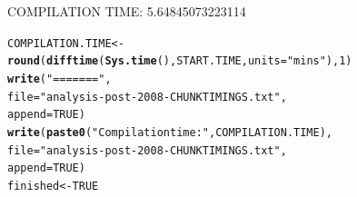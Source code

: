 \documentclass{scrreprt}\usepackage[]{graphicx}\usepackage[]{color}
\makeatletter
\newcommand{\hlnum}[1]{\textcolor[rgb]{0.686,0.059,0.569}{#1}}%
\newcommand{\hlstr}[1]{\textcolor[rgb]{0.192,0.494,0.8}{#1}}%
\newcommand{\hlstd}[1]{\textcolor[rgb]{0.345,0.345,0.345}{#1}}%
\newcommand{\hlkwb}[1]{\textcolor[rgb]{0.69,0.353,0.396}{#1}}%
\newcommand{\hlkwc}[1]{\textcolor[rgb]{0.333,0.667,0.333}{#1}}%
\newcommand{\hlkwd}[1]{\textcolor[rgb]{0.737,0.353,0.396}{\textbf{#1}}}%
\newenvironment{kframe}{%
 \def\at@end@of@kframe{}%
 \ifinner\ifhmode%
  \def\at@end@of@kframe{\end{minipage}}%
  \begin{minipage}{\columnwidth}%
 \fi\fi%
 \def\FrameCommand##1{\hskip\@totalleftmargin \hskip-\fboxsep
 \colorbox{shadecolor}{##1}\hskip-\fboxsep
     \hskip-\linewidth \hskip-\@totalleftmargin \hskip\columnwidth}%
 \MakeFramed {\advance\hsize-\width
   \@totalleftmargin\z@ \linewidth\hsize
   \@setminipage}}%
 {\par\unskip\endMakeFramed%
 \at@end@of@kframe}
\newenvironment{knitrout}{}{} %
\makeatother
\begin{document}
COMPILATION TIME: 5.64845073223114
\begin{knitrout}
\color{fgcolor}\begin{kframe}
\begin{alltt}
\hlstd{COMPILATION.TIME} \hlkwb{<-} \hlkwd{round}\hlstd{(}\hlkwd{difftime}\hlstd{(}\hlkwd{Sys.time}\hlstd{(), START.TIME,} \hlkwc{units} \hlstd{=} \hlstr{"mins"}\hlstd{),} \hlnum{1}\hlstd{)}
\hlkwd{write}\hlstd{(}\hlstr{"======="}\hlstd{,}
\hlkwc{file} \hlstd{=} \hlstr{"analysis-post-2008-CHUNKTIMINGS.txt"}\hlstd{,}
\hlkwc{append} \hlstd{=} \hlnum{TRUE}\hlstd{)}
\hlkwd{write}\hlstd{(}\hlkwd{paste0}\hlstd{(}\hlstr{"Compilation time: "}\hlstd{, COMPILATION.TIME),}
      \hlkwc{file} \hlstd{=} \hlstr{"analysis-post-2008-CHUNKTIMINGS.txt"}\hlstd{,}
      \hlkwc{append} \hlstd{=} \hlnum{TRUE}\hlstd{)}
\hlstd{finished} \hlkwb{<-} \hlnum{TRUE}
\end{alltt}
\end{kframe}
\end{knitrout}
\end{document}
